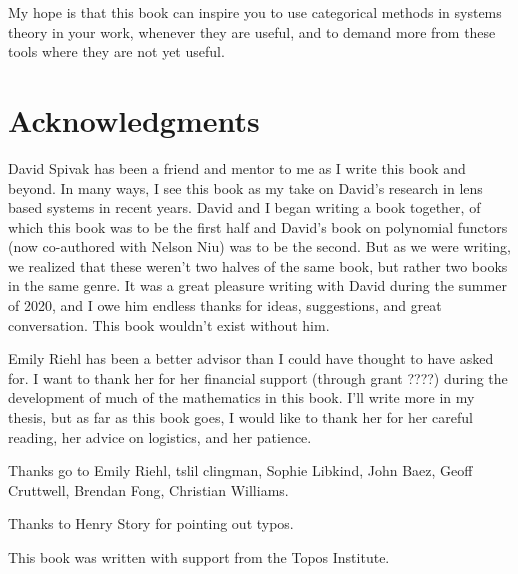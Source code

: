 \documentclass[DynamicalBook]{subfiles}
\begin{document}
My hope is that this book can inspire you to use categorical methods in systems theory in your work, whenever they are useful, and to demand more from these tools where they are not yet useful.







\section*{Acknowledgments}

David Spivak has been a friend and mentor to me as I write this book and beyond.
In many ways, I see this book as my take on David's research in lens based
systems in recent years. David and I began writing a book together, of which
this book was to be the first half and David's book on polynomial functors (now
co-authored with Nelson Niu) was to be the second. But as we were writing, we
realized that these weren't two halves of the same book, but rather two books
in the same genre. It was a great pleasure writing with David during the summer
of 2020, and I owe him endless thanks for ideas, suggestions, and great
conversation. This book wouldn't exist without him.

Emily Riehl has been a better advisor than I could have thought to have asked for. I want to thank her for her financial support (through grant ????) during the development of much of the mathematics in this book. I'll write more in my thesis, but as far as this book goes, I would like to thank her for her careful reading, her advice on logistics, and her patience.

Thanks go to Emily Riehl, tslil clingman, Sophie Libkind, John Baez, Geoff Cruttwell, Brendan
Fong, Christian Williams.

Thanks to Henry Story for pointing out typos.

This book was written with support from the Topos Institute.
\end{document}
